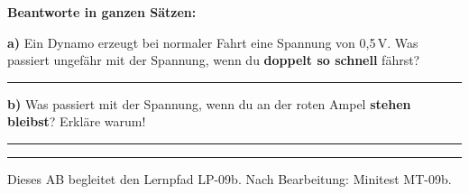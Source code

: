 \documentclass[11pt, a4paper]{article}
\begin{document}

\begin{merkkasten}

\textbf{Beantworte in ganzen Sätzen:}

\vspace{2mm}

\textbf{a)} Ein Dynamo erzeugt bei normaler Fahrt eine Spannung von 0,5\,V. Was passiert ungefähr mit der Spannung, wenn du \textbf{doppelt so schnell} fährst?

\vspace{0.8cm}
\rule{\linewidth}{0.3pt}

\vspace{3mm}

\textbf{b)} Was passiert mit der Spannung, wenn du an der roten Ampel \textbf{stehen bleibst}? Erkläre warum!

\vspace{0.8cm}
\rule{\linewidth}{0.3pt}

\vspace{0.5cm}
\rule{\linewidth}{0.3pt}

\end{merkkasten}


\vfill

\begin{center}
\small\textcolor{mittelgrau}{Dieses AB begleitet den Lernpfad LP-09b. Nach Bearbeitung: Minitest MT-09b.}
\end{center}
\end{document}

